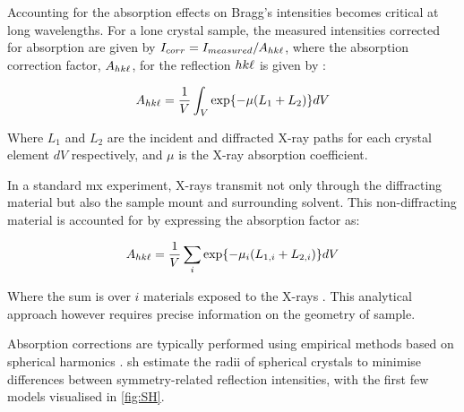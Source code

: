 

Accounting for the absorption effects on Bragg’s intensities becomes critical at long wavelengths. For a lone crystal sample, the measured intensities corrected for absorption are given by $I_{corr} = I_{measured}/A_{hk\ell}$, where the absorption correction factor, $A_{hk\ell}$, for the reflection $hk\ell$ is given by \cite{Albrecht1939}: %

\begin{equation}
    A_{hk\ell} = \frac{1}{V} \int_V \exp{-\mu(L_1+L_2)} dV
    \label{AbsFactor}
\end{equation}

Where $L_1$ and $L_2$ are the incident and diffracted X-ray paths for each crystal element $dV$ respectively, and $\mu$ is the X-ray absorption coefficient. \cite{Busing1957}

In a standard \ac{mx} experiment, X-rays transmit not only through the diffracting material but also the sample mount and surrounding solvent. This non-diffracting material is accounted for by expressing the absorption factor as:

\begin{equation}
    A_{hk\ell} = \frac{1}{V} \sum_i \exp{-\mu_i (L_{1,i}+L_{2,i})} dV
    \label{AbsFactor_allmaterials}
\end{equation}

Where the sum is over $i$ materials exposed to the X-rays \cite{Santoro1968}. This analytical approach however requires precise information on the geometry of sample.

Absorption corrections are typically performed using empirical methods based on spherical harmonics \cite{Blessing1995}. \ac{sh} estimate the radii of spherical crystals to minimise differences between symmetry-related reflection intensities, with the first few models visualised in \cref{fig:SH}. %


